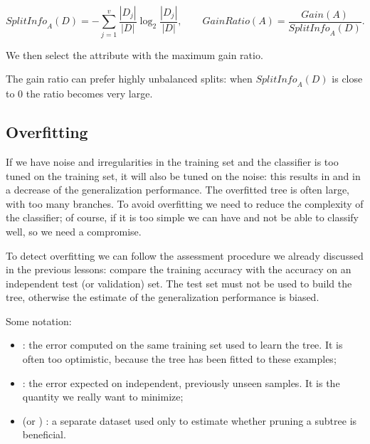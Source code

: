 \begin{definition}
  \[
    \mathit{SplitInfo}_A(D) = -\sum_{j=1}^{v} \frac{|D_j|}{|D|} \log_2 \frac{|D_j|}{|D|},
    \qquad
    \mathit{GainRatio}(A) = \frac{\mathit{Gain}(A)}{\mathit{SplitInfo}_A(D)}.
  \]
\end{definition}

We then select the attribute with the maximum gain ratio.

\begin{remark}
  The gain ratio can prefer highly unbalanced splits: when $\mathit{SplitInfo}_A(D)$ is close to $0$ the ratio becomes very large.
\end{remark}


\subsection{Overfitting}

If we have noise and irregularities in the training set and the classifier is too tuned on the training set, it will also be tuned on the noise: this results in  and in a decrease of the generalization performance. The overfitted tree is often large, with too many branches. To avoid overfitting we need to reduce the complexity of the classifier; of course, if it is too simple we can have  and not be able to classify well, so we need a compromise.

To detect overfitting we can follow the assessment procedure we already discussed in the previous lessons: compare the training accuracy with the accuracy on an independent test (or validation) set. The test set must not be used to build the tree, otherwise the estimate of the generalization performance is biased.

Some notation:
\begin{itemize}
  \item {}: the error computed on the same training set used to learn the tree. It is often too optimistic, because the tree has been fitted to these examples;
  \item {}: the error expected on independent, previously unseen samples. It is the quantity we really want to minimize;
  \item {} (or ) : a separate dataset used only to estimate whether pruning a subtree is beneficial.
\end{itemize}

